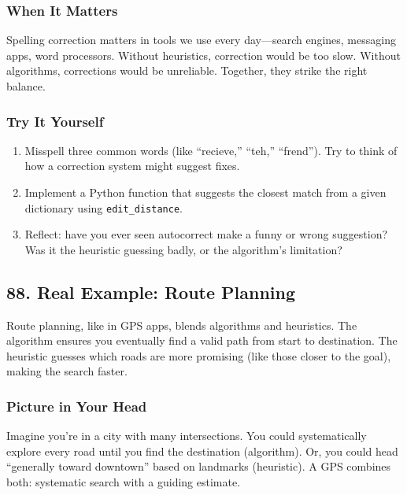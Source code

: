 \documentclass[
  letterpaper,
  DIV=11,
  numbers=noendperiod]{scrreprt}
\providecommand{\tightlist}{%
  \setlength{\itemsep}{0pt}\setlength{\parskip}{0pt}}
\begin{document}
\subsubsection{When It Matters}\label{when-it-matters-85}

Spelling correction matters in tools we use every day---search engines,
messaging apps, word processors. Without heuristics, correction would be
too slow. Without algorithms, corrections would be unreliable. Together,
they strike the right balance.

\subsubsection{Try It Yourself}\label{try-it-yourself-87}

\begin{enumerate}
\def\labelenumi{\arabic{enumi}.}
\tightlist
\item
  Misspell three common words (like ``recieve,'' ``teh,'' ``frend'').
  Try to think of how a correction system might suggest fixes.
\item
  Implement a Python function that suggests the closest match from a
  given dictionary using \texttt{edit\_distance}.
\item
  Reflect: have you ever seen autocorrect make a funny or wrong
  suggestion? Was it the heuristic guessing badly, or the algorithm's
  limitation?
\end{enumerate}

\subsection{88. Real Example: Route
Planning}\label{real-example-route-planning}

Route planning, like in GPS apps, blends algorithms and heuristics. The
algorithm ensures you eventually find a valid path from start to
destination. The heuristic guesses which roads are more promising (like
those closer to the goal), making the search faster.

\subsubsection{Picture in Your Head}\label{picture-in-your-head-88}

Imagine you're in a city with many intersections. You could
systematically explore every road until you find the destination
(algorithm). Or, you could head ``generally toward downtown'' based on
landmarks (heuristic). A GPS combines both: systematic search with a
guiding estimate.
\end{document}
